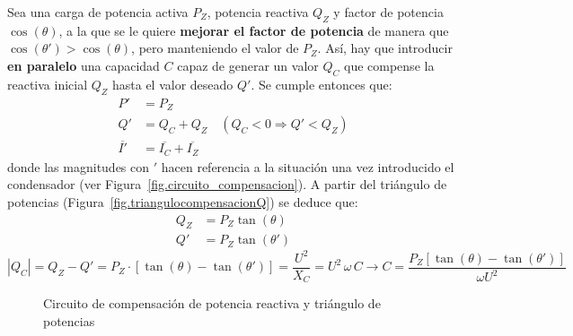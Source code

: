 	Sea una carga de potencia activa $P_Z$, potencia reactiva $Q_Z$ y factor de potencia $\cos(\theta)$, a la que se le quiere \textbf{mejorar el factor de potencia} de manera que $\cos (\theta') > \cos (\theta)$, pero manteniendo el valor de $P_Z$. Así, hay que introducir \textbf{en paralelo} una capacidad $C$ capaz de generar un valor $Q_C$ que compense la reactiva inicial $Q_Z$ hasta el valor deseado $Q'$. Se cumple entonces que: 
	\begin{align*}
		P' &= P_Z\\
		Q' &= Q_C + Q_Z \quad (Q_C<0\Rightarrow Q' < Q_Z)\\
		\overline{I'} &= \overline{I_C} + \overline{I_Z}
	\end{align*}
	donde las magnitudes con $'$ hacen referencia a la situación una vez introducido el condensador (ver Figura~\ref{fig.circuito_compensacion}). A partir del triángulo de potencias (Figura~\ref{fig.triangulocompensacionQ}) se deduce que:
	\begin{align*}
		Q_Z &= P_Z \tan (\theta)\\
		Q'&= P_Z \tan (\theta')
	\end{align*}
	\begin{equation}\label{eq.compensacion_Q_mono}
		|Q_C| = Q_Z - Q' = P_Z\cdot \left[\tan (\theta) - \tan (\theta')\right]=\dfrac{U^2}{X_C}={U^2\,\omega\,C}\rightarrow \boxed{C=\frac{P_Z \left[\tan (\theta) - \tan (\theta')\right]}{\omega U^2}}
	\end{equation}
	
	
	\begin{figure}
		\centering
		\hfil
		\caption{Circuito de compensación de potencia reactiva y triángulo de potencias}
		\label{fig.circuitocompensacionreactiva}
	\end{figure}
	
